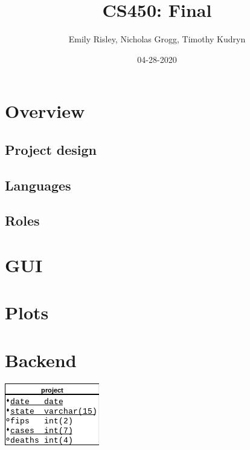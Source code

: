 \documentclass{article}
\title{CS450: Final }
\author{Emily Risley, Nicholas Grogg, Timothy Kudryn}
\date{04-28-2020}
\begin{document}
\maketitle

\section{Overview}

\subsection{Project design}

\subsection{Languages}

\subsection{Roles}

\section{GUI}

\section{Plots}

\section{Backend}
\includegraphics[scale=.9]{erdiagram.png}
\end{document}
